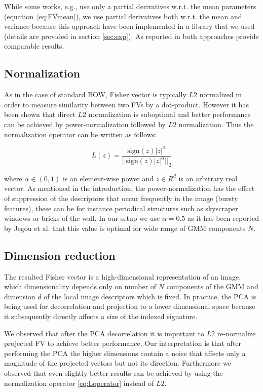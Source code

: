 \documentclass[table]{article} %
\newcommand\abs[1]{\left|#1\right|}
\newcommand\norm[1]{||#1||_2}
\begin{document}
		While some works, e.g.\cite{Perronnin2010}, use only a partial derivatives w.r.t. the mean parameters (equation~\eqref{eq:FVmean}), we use partial derivatives both w.r.t. the mean and variance because this approach have been implemented in a library that we used (details are provided in section \ref{sec:exp}). As reported in \cite{Jegou2010} both approaches provide comparable results.

		\subsection{Normalization}
			As in the case of standard BOW, Fisher vector is typically $L2$ normalized in order to measure similarity between two FVs by a dot-product. However it has been shown that direct $L2$ normalization is suboptimal and better performance can be achieved by power-normalization followed by $L2$ normalization. Thus the normalization operator can be written as follows:
			
			\begin{equation}
				L(z)=\dfrac{\text{sign} (z) \abs{z}^\alpha}{\norm{\text{sign}(z) \abs{z}^\alpha}}
				\label{eq:Loperator}
			\end{equation}

			\noindent
			where $\alpha \in (0,1)$ is an element-wise power and $z \in R^d$ is an arbitrary real vector. As mentioned in the introduction, the power-normalization has the effect of suppression of the descriptors that occur frequently in the image (bursty features), these can be for instance periodical structures such as skyscraper windows or bricks of the wall. In our setup we use $\alpha=0.5$ as it has been reported by Jegou et al. \cite{Jegou2012HAL} that this value is optimal for wide range of GMM components $N$.

		\subsection{Dimension reduction}
			The resulted Fisher vector is a high-dimensional representation of an image, which dimensionality depends only on number of $N$ components of the GMM and dimension $d$ of the local image descriptors which is fixed. In practice, the PCA is being used for decorrelation and projection to a lower dimensional space because it subsequently directly affects a size of the indexed signature. %

			We observed that after the PCA decorrelation it is important to $L2$ re-normalize projected FV to achieve better performance. Our interpretation is that after performing the PCA the higher dimensions contain a noise that affects only a magnitude of the projected vectors but not its direction. Furthermore we observed that even slightly better results can be achieved by using the normalization operator \eqref{eq:Loperator} instead of $L2$.
\end{document}
